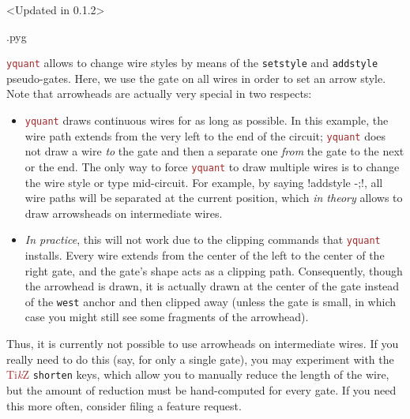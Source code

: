\documentclass{scrartcl}
\makeatletter
\newenvironment{codeexample}{%
   \VerbatimEnvironment%
   \let\FVB@VerbatimOut\minted@FVB@VerbatimOut
   \let\FVE@VerbatimOut\minted@FVE@VerbatimOut
   \minted@configlang{tex}%
   \minted@fvset
   \begin{VerbatimOut}[codes={\catcode`\^^I=12},firstline,lastline]{\minted@jobname.pyg}%
}{
   \end{VerbatimOut}%
   \minted@langlinenoson%
   \savebox\codeexamplebox{ \minted@jobname.pyg}%
   \ifdim\wd\codeexamplebox>\dimexpr.5\linewidth-3mm\relax%
      \wd\codeexamplebox=.5\linewidth%
   \else%
      \wd\codeexamplebox=\dimexpr\wd\codeexamplebox+3mm\relax%
   \fi%
   \noindent\begin{minipage}{\wd\codeexamplebox}%
      \centering%
      \usebox\codeexamplebox%
   \end{minipage}%
   \begin{minipage}{\dimexpr\linewidth-\wd\codeexamplebox\relax}%
      \expandafter\minted@pygmentize\expandafter{\minted@lang}%
   \end{minipage}%
   \minted@langlinenosoff%
   \par%
}
\def\TikZ{\textcolor{brown}{Ti\textit kZ}}
\def\pkg#1{\textcolor{brown}{\texttt{#1}}}
\def\ttlink{\link\texttt}
\def\Yquant{\pkg{yquant}}
\makeatother
\begin{document}
               \begin{example}<Updated in 0.1.2>
                  \begin{codeexample}
                  \end{codeexample}
                  \Yquant{} allows to change wire styles by means of the \ttlink{setstyle} and \ttlink{addstyle} pseudo\hyp gates.
                  Here, we use the gate on all wires in order to set an arrow style.
                  Note that arrowheads are actually very special in two respects:
                  \begin{itemize}
                     \item \Yquant{} draws continuous wires for as long as possible.
                        In this example, the wire path extends from the very left to the end of the circuit; \Yquant{} does not draw a wire \emph{to} the gate and then a separate one \emph{from} the gate to the next or the end.
                        The only way to force \Yquant{} to draw multiple wires is to change the wire style or type mid\hyp circuit.
                        For example, by saying \yquant!addstyle {} -;!, all wire paths will be separated at the current position, which \emph{in theory} allows to draw arrowsheads on intermediate wires.
                     \item \emph{In practice}, this will not work due to the clipping commands that \Yquant{} installs.
                        Every wire extends from the center of the left to the center of the right gate, and the gate's shape acts as a clipping path.
                        Consequently, though the arrowhead is drawn, it is actually drawn at the center of the gate instead of the \texttt{west} anchor and then clipped away (unless the gate is small, in which case you might still see some fragments of the arrowhead).
                  \end{itemize}
                  Thus, it is currently not possible to use arrowheads on intermediate wires.
                  If you really need to do this (say, for only a single gate), you may experiment with the \TikZ{} \texttt{shorten} keys, which allow you to manually reduce the length of the wire, but the amount of reduction must be hand\hyp computed for every gate.
                  If you need this more often, consider filing a feature request.
               \end{example}
\end{document}

